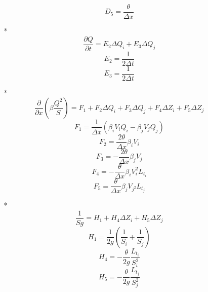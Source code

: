 \begin{itemize}
\begin{itemize}
\begin{equation}
    D_5 = \frac{\theta}{\Delta x}
  \end{equation}
 \item[*]
   \begin{equation}
     \frac{\partial Q}{\partial t} = E_2 \Delta Q_i + E_3 \Delta Q_j
   \end{equation}
   \begin{equation}
     E_2 = \frac{1}{2 \Delta t}
   \end{equation}
   \begin{equation}
     E_3 = \frac{1}{2 \Delta t}
   \end{equation}
 \item[*]
   \begin{equation}
    \frac{\partial}{\partial x} \left ( \beta \frac{Q^2}{S} \right ) = F_1 + F_2 \Delta Q_i + F_3 \Delta Q_j + F_4 \Delta Z_i + F_5 \Delta Z_j 
   \end{equation}
   \begin{equation}
     F_1 = \frac{1}{\Delta x} ( \beta_i V_i Q_i - \beta_j V_j Q_j )
   \end{equation}
   \begin{equation}
     F_2 = \frac{2 \theta}{\Delta x} \beta_i V_i
   \end{equation}
   \begin{equation}
     F_3 = -\frac{2 \theta}{\Delta x} \beta_j V_j
   \end{equation}
   \begin{equation}
     F_4 = - \frac{\theta}{\Delta x} \beta_i V_{i}^2 L_{t_i}
   \end{equation}
   \begin{equation}
     F_5 = \frac{\theta}{\Delta x} \beta_j V_{j^2} L_{t_j}
   \end{equation}
 \item[*]
   \begin{equation}
    \frac{1}{S g} = H_1 + H_4 \Delta Z_i + H_5 \Delta Z_j
   \end{equation}
   \begin{equation}
     H_1 = \frac{1}{2 g} \left ( \frac{1}{S_i} + \frac{1}{S_j} \right )
   \end{equation}
   \begin{equation}
     H_4 = - \frac{\theta}{2 g} \frac{L_{t_i}}{S_{i}^2}
   \end{equation}
   \begin{equation}
     H_5 = - \frac{\theta}{2 g} \frac{L_{t_j}}{S_{j}^2}
   \end{equation}
\end{itemize}

\end{itemize}


